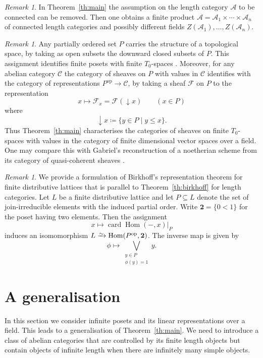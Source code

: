 \documentclass[a4paper]{amsart}
\theoremstyle{plain}
\theoremstyle{definition}
\theoremstyle{remark}
\newtheorem{rem}[thm]{Remark}
\numberwithin{equation}{section}
\newcommand{\card}{\operatorname{card}}
\newcommand{\Hom}{\operatorname{Hom}}
\newcommand{\op}{\mathrm{op}}
\newcommand{\two}{\mathbf{2}}
\newcommand{\iso}{\xrightarrow{\raisebox{-.4ex}[0ex][0ex]{$\scriptstyle{\sim}$}}}
\def\A{\mathcal A}
\def\C{\mathcal C}
\def\p{\phi}
\begin{document}
\begin{rem}
  In Theorem~\ref{th:main} the assumption on the length category $\A$
  to be connected can be removed. Then one obtains a finite product
  $\A=\A_1\times\cdots\times\A_n$ of connected length categories and
  possibly different fields $Z(\A_1),\ldots,Z(\A_n)$.
\end{rem}  

\begin{rem}\label{re:sheaves}
  Any partially ordered set $P$ carries the structure of a topological
  space, by taking as open subsets the downward closed subsets of
  $P$. This assignment identifies finite posets with finite
  $T_0$-spaces \cite[\S1]{Al1937}.  Moreover, for any abelian category $\C$ the category
  of sheaves on $P$ with values in $\C$ identifies with the category
  of representations $P^\op\to\C$, by taking a sheaf $\mathscr F$ on
  $P$ to the representation
\[x\longmapsto \mathscr F_x=\mathscr F(\downarrow\! x)\qquad (x\in P)\]
where 
\[\downarrow\! x\coloneqq \{y\in P\mid y\le x\}.\]
Thus Theorem~\ref{th:main} characterises the categories of sheaves on
finite $T_0$-spaces with values in the category of finite dimensional
vector spaces over a field. One may compare this with Gabriel's
reconstruction of a noetherian scheme from its category of
quasi-coherent sheaves \cite[VI]{Ga1962}.
\end{rem}

\begin{rem}\label{re:birkhoff}
  We provide a formulation of Birkhoff's representation theorem for
  finite distributive lattices that is parallel to
  Theorem~\ref{th:birkhoff} for length categories.  Let $L$ be a
  finite distributive lattice and let $P\subseteq L$ denote the set
  of join-irreducible elements with the induced partial order. Write
  $\two=\{0<1\}$ for the poset having two elements. Then the
  assignment
\[x\longmapsto\card\Hom(-,x)|_{P}\]
induces an isomomorphism $L\iso\Hom(P^\op,\two)$.  The inverse map is given
by
\[\p\longmapsto\bigvee_{\substack{y\in P\\\p(y)=1}} y.\]
\end{rem}


\section{A generalisation}

In this section we consider infinite posets and its linear
representations over a field. This leads to a generalisation of
Theorem~\ref{th:main}. We need to introduce a class of abelian
categories that are controlled by its finite length objects but
contain objects of infinite length when there are infinitely many
simple objects.
\end{document}
